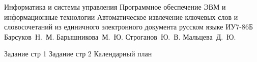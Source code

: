 \documentclass{bmstu}
\begin{document}
\makethesistitle
{Информатика и системы управления} %
{Программное обеспечение ЭВМ и информационные технологии} %
{Автоматическое извлечение ключевых слов и словосочетаний из единичного электронного документа русском языке} %
{ИУ7-86Б} %
{Барсуков~Н.~М.} %
{Барышникова~М.~Ю.} %
{Строганов~Ю.~В.} %
{} 
{Мальцева~Д.~Ю.} %

\newpage
Задание стр 1
\newpage
Задание стр 2
\newpage
Календарный план
\newpage



\maketableofcontents










\makebibliography


\end{document}
